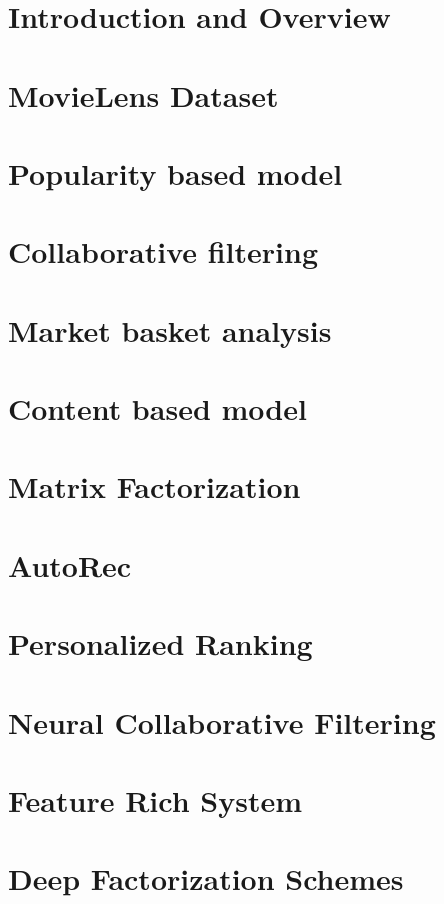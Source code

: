 \documentclass[11pt,fleqn]{book} %
\begin{document}
\chapter{Introduction and Overview}
\chapter{MovieLens Dataset}
\chapter{Popularity based model}
\chapter{Collaborative filtering}
\chapter{Market basket analysis}
\chapter{Content based model}
\chapter{Matrix Factorization}
\chapter{AutoRec}
\chapter{Personalized Ranking}
\chapter{Neural Collaborative Filtering}
\chapter{Feature Rich System}
\chapter{Deep Factorization Schemes}

\end{document}
